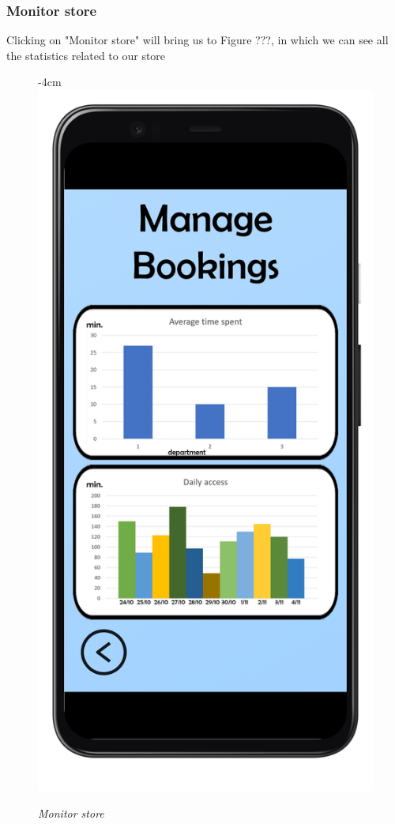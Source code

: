 \documentclass{article}
\begin{document}
		\subsubsection{Monitor store}
		
		Clicking on "Monitor store" will bring us to Figure ???, in which we can see all the statistics related to our store
		
		\begin{figure}[H]
			\begin{adjustwidth} {-4cm}{}
				\centering
				\includegraphics[scale=0.45]{../Mockups/Statistics.png}\\
			\end{adjustwidth}
			\caption{\emph{Monitor store}}
		\end{figure}
		
\end{document}
